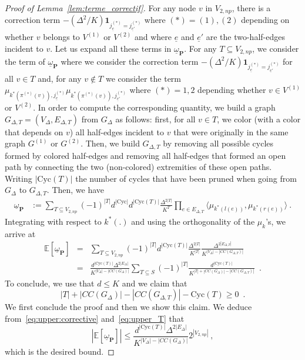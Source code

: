 \documentclass{article}
\begin{document}
    
    \begin{proof}[Proof of Lemma~\ref{lem:terme_correctif}]
    For any node $v$ in $V_{2,np}$, there is a correction term $-(\Delta^2/K) \mathbf{1}_{j^{(*)}_{\underline{e}}= j^{(*)}_{\underline{e}'}}$ where $(*)=(1),(2)$ depending on whether $v$ belongs to $V^{(1)}$ or $V^{(2)}$ and where $\underline{e}$ and $\underline{e}'$ are the two-half-edges incident to $v$. 
    Let us expand all these terms in $\underline{\omega}_{\mathbf{P}}$. For any $T\subseteq V_{2,np}$, we consider the term of $\underline{\omega}_{\mathbf{P}}$ where we consider the correction term 
    $-(\Delta^2/K) \mathbf{1}_{j^{(*)}_{\underline{e}}= j^{(*)}_{\underline{e}'}}$ for all $v\in T$ and, for any $v\notin T$ we consider the term 
    $\mu_{k^{*}(\pi^{(*)}(v)),j^{(*)}_{\underline{e}}} \mu_{k^{*}(\pi^{(*)}(v)),j^{(*)}_{\underline{e}'}}$ where $(*)=1,2$ depending whether $v\in V^{(1)}$ or $V^{(2)}$. In order to compute the corresponding quantity, we build a graph $G_{\Delta,T}=(V_{\Delta},E_{\Delta,T})$ from $G_{\Delta}$ as follows: first, for all $v\in T$, we color (with a color that depends on $v$) all half-edges incident to $v$ that were originally in the same graph $G^{(1)}$ or $G^{(2)}$. Then, we build $G_{\Delta,T}$ by removing all possible cycles formed by colored half-edges and removing all half-edges that formed an open path by connecting the two (non-colored) extremities of these open paths. Writing $|\mathrm{Cyc}(T)|$ the number of cycles that have been pruned when going from $G_{\Delta}$ to $G_{\Delta,T}$. Then, we have 
    \begin{eqnarray*}
        \underline{\omega}_{\mathbf{P}} &:= \sum_{T\subseteq V_{2,np}} (-1)^{|T|} d^{|\mathrm{Cyc}|} d^{|\mathrm{Cyc}(T)|} \frac{\Delta^{2|T|}}{K^{T}}\prod_{e\in E_{\Delta,T}} \langle \mu_{k^*(l(e))},  \mu_{k^*(r(e))}\rangle\ .
    \end{eqnarray*}
    Integrating with respect to $k^*(.)$ and using the orthogonality  of the $\mu_k$'s, we arrive at 
    \begin{eqnarray}\nonumber
    \mathbb{E}\left[\underline{\omega}_{\mathbf{P}}\right]&=& \sum_{T\subseteq V_{2,np}} (-1)^{|T|}  d^{|\mathrm{Cyc}(T)|} \frac{\Delta^{2|T|}}{K^{|T|}} \frac{\Delta^{2|E_{\Delta,T}|}}{K^{|V_{\Delta}|-|CC(G_{\Delta,T})|}} \\
    & = &   \frac{d^{|\mathrm{Cyc}(T)|} \Delta^{2|E_{\Delta}|}}{K^{|V_{\Delta}|-|CC(G_{\Delta})|}}\sum_{T\subseteq S} (-1)^{|T|}  \frac{d^{|\mathrm{Cyc}(T)|}}{K^{|T|+|CC(G_{\Delta})| -|CC(G_{\Delta,T})|}} \enspace . \label{eq:upper:corrective}
    \end{eqnarray}
    To conclude, we use that $d\leq K$ and we claim that  
    \begin{equation}\label{eq:upper_T}
    |T|+ |CC(G_{\Delta})| -|CC(G_{\Delta,T})|- \mathrm{Cyc}(T)\geq 0\enspace . 
    \end{equation}
    We first conclude the proof and then we show this claim. We deduce from~\eqref{eq:upper:corrective} and~\eqref{eq:upper_T} that 
    \[
    \left|\mathbb{E}\left[\underline{\omega}_{\mathbf{P}}\right]\right|\leq \frac{d^{|\mathrm{Cyc}(T)|} \Delta^{2|E_{\Delta}|}}{K^{|V_{\Delta}|-|CC(G_{\Delta})|}} 2^{|V_{2,np}|}\ , 
    \]
    which is the desired bound. 
    

\end{proof}
\end{document}
